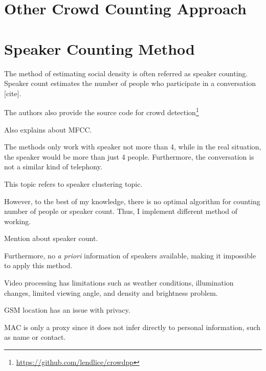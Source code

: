 \section{Other Crowd Counting Approach} %
\label{sec:other_crowd_counting_approach}


\section{Speaker Counting Method} %
\label{sec:speaker_counting_method}
The method of estimating social density is often referred as speaker counting. Speaker count estimates the number of people who participate in a conversation [cite].

The authors also provide the source code for crowd detection\footnote{\url{https://github.com/lendlice/crowdpp}}

Also explains about MFCC.

The methods only work with speaker not more than 4, while in the real situation, the speaker would be more than just 4 people. Furthermore, the conversation is not a similar kind of telephony.

This topic refers to speaker clustering topic.

However, to the best of my knowledge, there is no optimal algorithm for counting number of people or speaker count. Thus, I implement different method of working.

Mention about speaker count.

Furthermore, no \textit{a priori} information of speakers available, making it impossible to apply this method.

Video processing has limitations such as weather conditions, illumination changes, limited viewing angle, and density and brightness problem. 

GSM location has an issue with privacy\cite{thesis017}.

MAC is only a proxy since it does not infer directly to personal information, such as name or contact.


